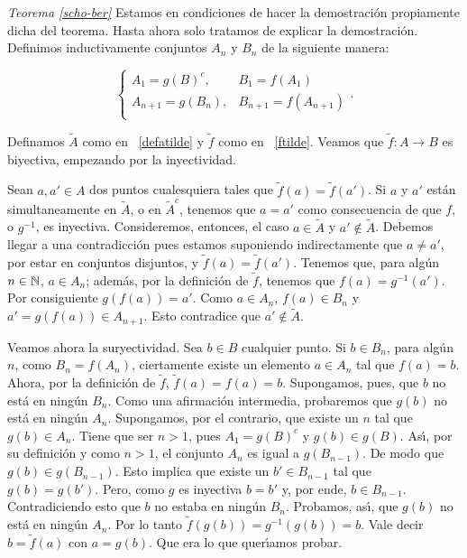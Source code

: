 \vspace{10pt}
\begin{demo}\emph{Teorema \ref{scho-ber}} Estamos en condiciones de hacer la demostraci\'on propiamente
dicha del teorema. Hasta ahora solo tratamos de explicar la
demostraci\'on. Definimos inductivamente conjuntos $A_n$ y $B_n$
de la siguiente manera:

\[\left\{%
\begin{array}{ll}
    A_1=g(B)^c, & B_1=f(A_1) \\
    A_{n+1}=g(B_n), & B_{n+1}=f(A_{n+1}) \\
\end{array}%
\right..\]

Definamos $\tilde{A}$  como en ~\eqref{defatilde} y $\tilde{f}$
como en ~\eqref{ftilde}. Veamos que $\tilde{f}:A\longrightarrow B$
es biyectiva, empezando por la inyectividad.

Sean $a,a'\in A$ dos puntos cualesquiera tales que
$\tilde{f}(a)=\tilde{f}(a')$. Si $a$ y $a'$ est\'an
simultaneamente en $\tilde{A}$, o en $\tilde{A}^c$, tenemos que
$a=a'$ como consecuencia de que $f$, o $g^{-1}$, es inyectiva.
Consideremos, entonces, el caso $a\in\tilde{A}$ y $a'\notin
\tilde{A}$. Debemos llegar a una contradicci\'on pues estamos
suponiendo indirectamente que $a\neq a'$, por estar en conjuntos
disjuntos, y $\tilde{f}(a)=\tilde{f}(a')$. Tenemos que, para
alg\'un $n\in\nn$, $a\in A_n$; adem\'as, por la definici\'on de
$\tilde{f}$, tenemos que $f(a)=g^{-1}(a')$. Por consiguiente
$g(f(a))=a'$. Como $a\in A_n$, $f(a)\in B_n$ y $a'=g(f(a))\in
A_{n+1}$. Esto contradice que $a'\notin\tilde{A}$.

Veamos ahora la suryectividad. Sea $b\in B$ cualquier punto. Si
$b\in B_n$, para alg\'un $n$, como $B_n=f(A_n)$, ciertamente
existe un elemento $a\in A_n$ tal que $f(a)=b$. Ahora, por la
definici\'on de $\tilde{f}$, $\tilde{f}(a)=f(a)=b$. Supongamos,
pues, que $b$ no est\'a en ning\'un $B_n$. Como una afirmaci\'on
intermedia, probaremos que $g(b)$ no est\'a en ning\'un $A_n$.
Supongamos, por el contrario, que existe un $n$ tal que $g(b)\in
A_n$. Tiene que ser $n>1$, pues $A_1=g(B)^c$ y $g(b)\in g(B)$.
As\'{\i}, por su definici\'on  y como $n>1$, el conjunto $A_n$ es
igual a $g(B_{n-1})$. De modo que $g(b)\in g(B_{n-1})$. Esto
implica que existe un $b'\in B_{n-1}$ tal que $g(b)=g(b')$. Pero,
como $g$ es inyectiva $b=b'$ y, por ende, $b\in B_{n-1}$.
Contradiciendo esto que $b$ no estaba en ning\'un $B_n$. Probamos,
as\'{\i}, que $g(b)$ no est\'a en ning\'un $A_n$. Por lo tanto
$\tilde{f}(g(b))=g^{-1}(g(b))=b$. Vale decir $b=\tilde{f}(a)$ con
$a=g(b)$. Que era lo que quer\'{\i}amos probar.
\end{demo}

